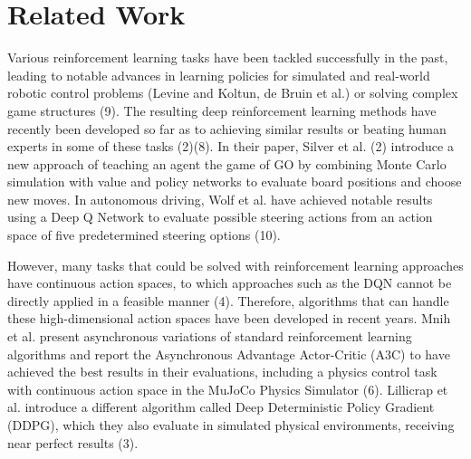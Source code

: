 \documentclass[letterpaper, 10 pt, conference]{ieeeconf}  %
\begin{document}

\section{Related Work}

Various reinforcement learning tasks have been tackled successfully in the past, leading to notable advances in learning policies for simulated and real-world robotic control problems (Levine and Koltun, de Bruin et al.) or solving complex game structures (9). The resulting deep reinforcement learning methods have recently been developed so far as to achieving similar results or beating human experts in some of these tasks (2)(8). In their paper, Silver et al. (2) introduce a new approach of teaching an agent the game of GO by combining Monte Carlo simulation with value and policy networks to evaluate board positions and choose new moves. In autonomous driving, Wolf et al. have achieved notable results using a Deep Q Network to evaluate possible steering actions from an action space of five predetermined steering options (10). 

However, many tasks that could be solved with reinforcement learning approaches have continuous action spaces, to which approaches such as the DQN cannot be directly applied in a feasible manner (4). Therefore, algorithms that can handle these high-dimensional action spaces have been developed in recent years. Mnih et al. present asynchronous variations of standard reinforcement learning algorithms and report the Asynchronous Advantage Actor-Critic (A3C) to have achieved the best results in their evaluations, including a physics control task with continuous action space in the MuJoCo Physics Simulator (6). Lillicrap et al. introduce a different algorithm called Deep Deterministic Policy Gradient (DDPG), which they also evaluate in simulated physical environments, receiving near perfect results (3).
\end{document}
